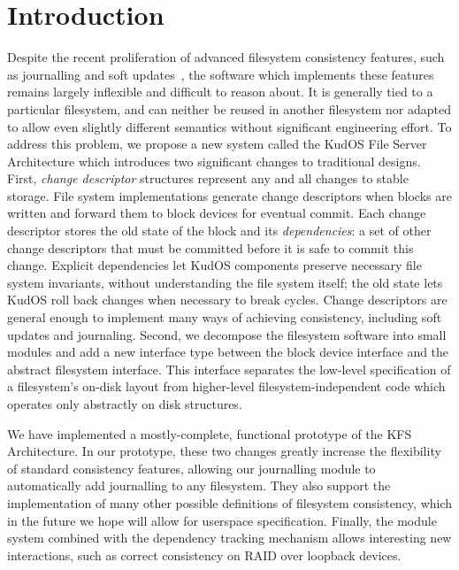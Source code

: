 \section*{Introduction}
\label{sec:intro}

Despite the recent proliferation of advanced filesystem consistency
features, such as journalling and soft updates~\cite{ganger00soft},
the software which implements these features remains largely
inflexible and difficult to reason about. It is generally tied to a
particular filesystem, and can neither be reused in another filesystem
nor adapted to allow even slightly different semantics without
significant engineering effort. To address this problem, we propose a
new system called the KudOS File Server Architecture which introduces
two significant changes to traditional designs. 
%
First, \emph{change descriptor} structures represent any and all changes to
stable storage.
%
File system implementations generate change descriptors when blocks are
written and forward them to block devices for eventual commit.
%
Each change descriptor stores the old state of the block and its
\emph{dependencies}: a set of other change descriptors that must be
committed before it is safe to commit this change.
%
Explicit dependencies let KudOS components preserve necessary file system
invariants, without understanding the file system itself; the old state
lets KudOS roll back changes when necessary to break cycles.
%
Change descriptors are general enough to implement many ways of achieving
consistency, including soft updates and journaling.  
%
%
%
Second,
we decompose the filesystem software into small modules and add a new
interface type between the block device interface and the abstract
filesystem interface.  This interface separates the low-level
specification of a filesystem's on-disk layout from higher-level
filesystem-independent code which operates only abstractly on disk
structures.

We have implemented a mostly-complete, functional prototype of the KFS
Architecture. In our prototype, these two changes greatly increase the
flexibility of standard consistency features, allowing our journalling
module to automatically add journalling to any filesystem. They also support
the implementation of many other possible definitions of filesystem
consistency, which in the future we hope will allow for userspace
specification. Finally, the module system combined with the dependency
tracking mechanism allows interesting new interactions, such as correct
consistency on RAID over loopback devices.
